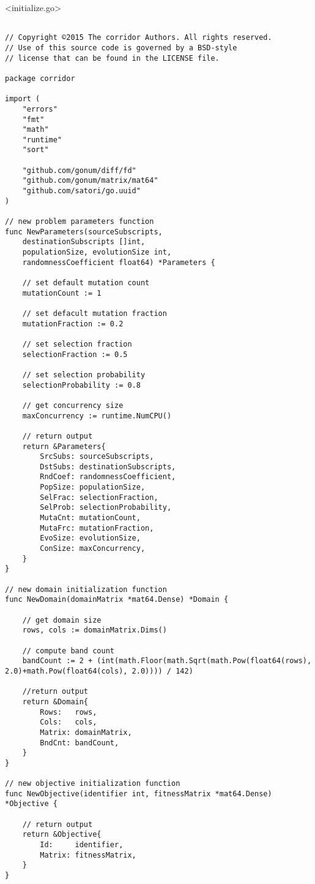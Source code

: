 \newpage

<initialize.go>

\begin{lstlisting}[basicstyle=\tiny]

// Copyright ©2015 The corridor Authors. All rights reserved.
// Use of this source code is governed by a BSD-style
// license that can be found in the LICENSE file.

package corridor

import (
	"errors"
	"fmt"
	"math"
	"runtime"
	"sort"

	"github.com/gonum/diff/fd"
	"github.com/gonum/matrix/mat64"
	"github.com/satori/go.uuid"
)

// new problem parameters function
func NewParameters(sourceSubscripts, 
    destinationSubscripts []int, 
    populationSize, evolutionSize int, 
    randomnessCoefficient float64) *Parameters {

	// set default mutation count
	mutationCount := 1

	// set defacult mutation fraction
	mutationFraction := 0.2

	// set selection fraction
	selectionFraction := 0.5

	// set selection probability
	selectionProbability := 0.8

	// get concurrency size
	maxConcurrency := runtime.NumCPU()

	// return output
	return &Parameters{
		SrcSubs: sourceSubscripts,
		DstSubs: destinationSubscripts,
		RndCoef: randomnessCoefficient,
		PopSize: populationSize,
		SelFrac: selectionFraction,
		SelProb: selectionProbability,
		MutaCnt: mutationCount,
		MutaFrc: mutationFraction,
		EvoSize: evolutionSize,
		ConSize: maxConcurrency,
	}
}

// new domain initialization function
func NewDomain(domainMatrix *mat64.Dense) *Domain {

	// get domain size
	rows, cols := domainMatrix.Dims()

	// compute band count
	bandCount := 2 + (int(math.Floor(math.Sqrt(math.Pow(float64(rows), 2.0)+math.Pow(float64(cols), 2.0)))) / 142)

	//return output
	return &Domain{
		Rows:   rows,
		Cols:   cols,
		Matrix: domainMatrix,
		BndCnt: bandCount,
	}
}

// new objective initialization function
func NewObjective(identifier int, fitnessMatrix *mat64.Dense) *Objective {

	// return output
	return &Objective{
		Id:     identifier,
		Matrix: fitnessMatrix,
	}
}


\end{lstlisting}
